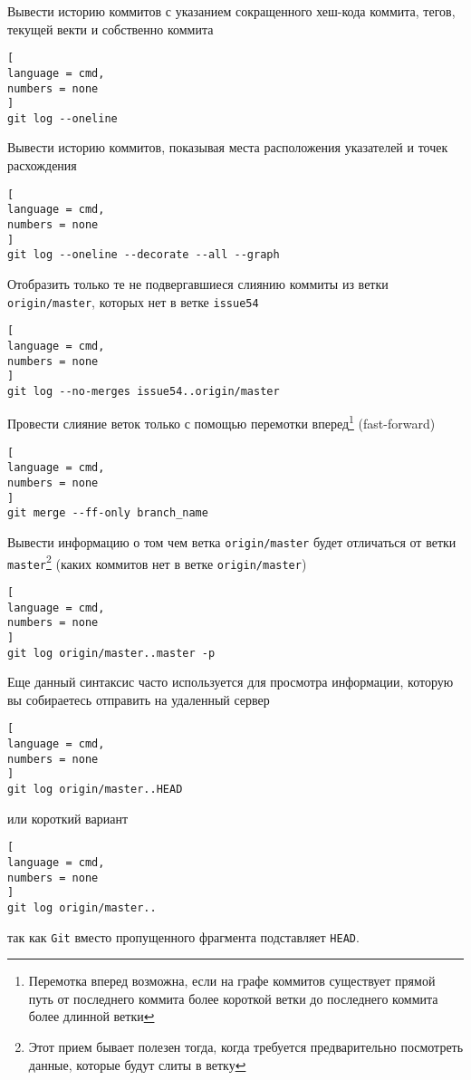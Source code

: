 \documentclass[%
	11pt,
	a4paper,
	utf8,
		]{article}
\begin{document}
Вывести историю коммитов с указанием сокращенного хеш-кода коммита, тегов, текущей векти и собственно коммита

\begin{lstlisting}[
language = cmd,
numbers = none
]
git log --oneline
\end{lstlisting}


Вывести историю коммитов, показывая места расположения указателей и точек расхождения

\begin{lstlisting}[
language = cmd,
numbers = none
]
git log --oneline --decorate --all --graph
\end{lstlisting}

Отобразить только те не подвергавшиеся слиянию коммиты из ветки \texttt{origin/master}, которых нет в ветке \texttt{issue54}

\begin{lstlisting}[
language = cmd,
numbers = none
]
git log --no-merges issue54..origin/master
\end{lstlisting}

Провести слияние веток только с помощью перемотки вперед\footnote{Перемотка вперед возможна, если на графе коммитов существует прямой путь от последнего коммита более короткой ветки до последнего коммита более длинной ветки} (fast-forward)
\begin{lstlisting}[
language = cmd,
numbers = none
]
git merge --ff-only branch_name
\end{lstlisting}

Вывести информацию о том чем ветка \texttt{origin/master} будет отличаться от ветки \texttt{master}\footnote{Этот прием бывает полезен тогда, когда требуется предварительно посмотреть данные, которые будут слиты в ветку} (каких коммитов нет в ветке \texttt{origin/master})

\begin{lstlisting}[
language = cmd,
numbers = none
]
git log origin/master..master -p
\end{lstlisting}

Еще данный синтаксис часто используется для просмотра информации, которую вы собираетесь отправить на удаленный сервер

\begin{lstlisting}[
language = cmd,
numbers = none
]
git log origin/master..HEAD
\end{lstlisting}
или короткий вариант
\begin{lstlisting}[
language = cmd,
numbers = none
]
git log origin/master..
\end{lstlisting}
так как \texttt{Git} вместо пропущенного фрагмента подставляет \texttt{HEAD}.
\end{document}
